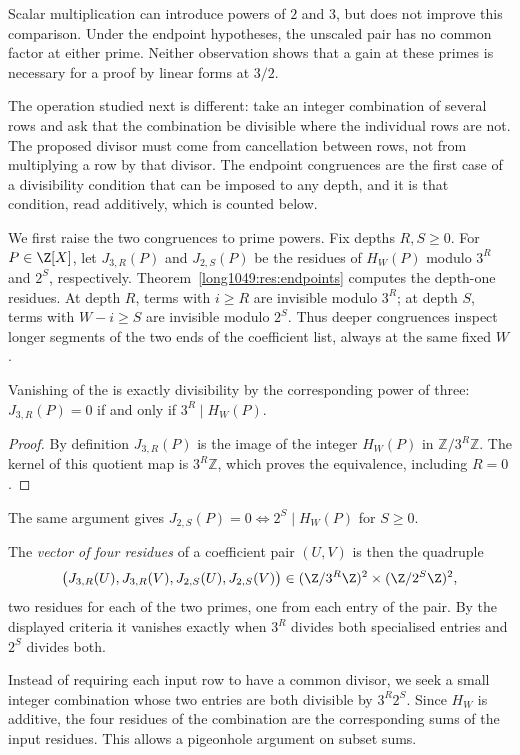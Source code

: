 \noindent Scalar multiplication can introduce powers of $2$ and $3$,
but does not improve this comparison. Under the endpoint hypotheses,
the unscaled pair has no common factor at either prime. Neither
observation shows that a gain at these primes is necessary for a proof
by linear forms at $3/2$.

The operation studied next is different: take an integer combination
of several rows and ask that the combination be divisible where the
individual rows are not. The proposed divisor must come from
cancellation between rows, not from multiplying a row by that divisor.
The endpoint congruences are the first case of a divisibility condition that can be imposed
to any depth, and it is that condition, read additively, which is counted
below.

We first raise the two congruences to prime powers.  Fix depths \(R,S\ge0\).
For $P\in\Z[X]$, let $J_{3,R}(P)$ and $J_{2,S}(P)$ be the residues of
$H_W(P)$ modulo $3^R$ and $2^S$, respectively.
Theorem~\ref{long1049:res:endpoints} computes the depth-one residues.
At depth $R$, terms with $i\ge R$ are invisible modulo $3^R$;
at depth $S$, terms with $W-i\ge S$ are invisible modulo $2^S$.
Thus deeper congruences inspect longer segments of the two ends
of the coefficient list, always at the same fixed $W$.

\begin{lemma}\label{res:bottomjet}
Vanishing of the
is exactly divisibility by the corresponding power of three:
$J_{3,R}(P)=0$ if and only if $3^R\mid H_W(P)$.
\end{lemma}
\begin{proof}
By definition $J_{3,R}(P)$ is the image of the integer $H_W(P)$ in
$\mathbb Z/3^R\mathbb Z$. The kernel of this quotient map is
$3^R\mathbb Z$, which proves the equivalence, including $R=0$.
\end{proof}
The same argument gives
$J_{2,S}(P)=0\iff2^S\mid H_W(P)$ for $S\ge0$.

The \emph{vector of four residues} of a coefficient pair
\((U,V)\) is then the quadruple
\[
 \bigl(J_{3,R}(U),J_{3,R}(V),J_{2,S}(U),J_{2,S}(V)\bigr)
 \in(\Z/3^R\Z)^2\times(\Z/2^S\Z)^2 ,
\]
two residues for each of the two primes, one from each entry of the pair.  By
the displayed criteria it vanishes exactly when \(3^R\) divides both specialised
entries and \(2^S\) divides both.

Instead of requiring each input row to have a common divisor, we seek
a small integer combination whose two entries are both divisible by
$3^R2^S$. Since $H_W$ is additive, the four residues of the combination
are the corresponding sums of the input residues. This allows a
pigeonhole argument on subset sums.

